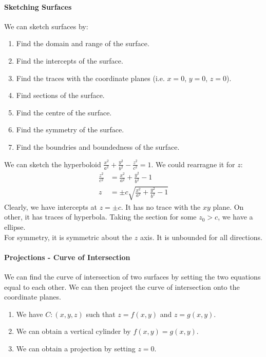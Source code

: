 \documentclass[11pt]{article}
\begin{document}
\paragraph{Sketching Surfaces} We can sketch surfaces by:
\begin{enumerate}
    \item Find the domain and range of the surface.
    \item Find the intercepts of the surface.
    \item Find the traces with the coordinate planes (i.e. $x=0$, $y=0$, $z=0$).
    \item Find sections of the surface.
    \item Find the centre of the surface.
    \item Find the symmetry of the surface.
    \item Find the boundries and boundedness of the surface.
\end{enumerate}
\begin{example}[Hyperboloid]
    We can sketch the hyperboloid $\frac{x^2}{a^2} + \frac{y^2}{b^2} - \frac{z^2}{c^2} = 1$. We could rearragne it for $z$:
    \begin{align*}
        \frac{z^2}{c^2} &= \frac{x^2}{a^2} + \frac{y^2}{b^2} - 1 \\
        z &= \pm c \sqrt{\frac{x^2}{a^2} + \frac{y^2}{b^2} - 1}
    \end{align*}
    Clearly, we have intercepts at $z = \pm c$. It has no trace with the $xy$ plane. On other, it has traces of hyperbola. Taking the section for some $z_0 > c$, we have a ellipse.\\
    For symmetry, it is symmetric about the $z$ axis. It is unbounded for all directions.
\end{example}
\paragraph{Projections - Curve of Intersection} We can find the curve of intersection of two surfaces by setting the two equations equal to each other. We can then project the curve of intersection onto the coordinate planes.
\begin{enumerate}
    \item We have $C: (x, y, z)$ such that $z = f(x, y)$ and $z = g(x, y)$.
    \item We can obtain a vertical cylinder by $f(x, y) = g(x, y)$.
    \item We can obtain a projection by setting $z = 0$.
\end{enumerate}
\end{document}
